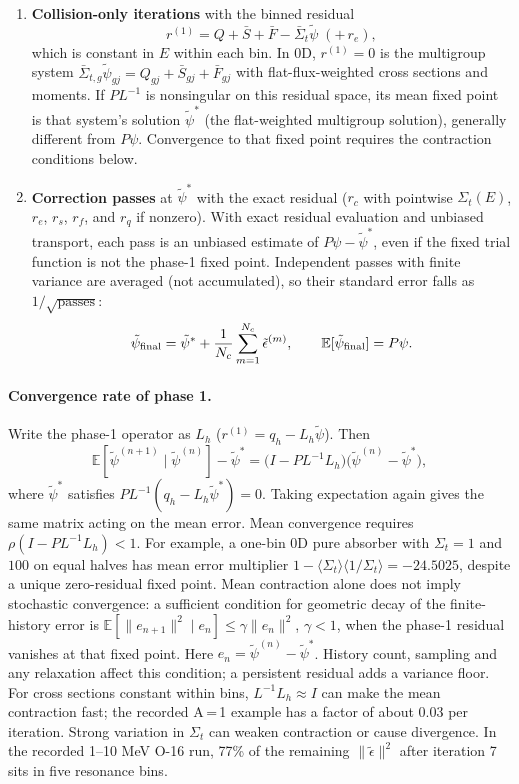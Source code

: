 \documentclass[11pt]{article}
\newcommand{\E}{\mathbb{E}}
\newcommand{\tpsi}{\tilde\psi}
\newcommand{\teps}{\tilde\epsilon}
\newcommand{\Sbar}{\bar S}
\newcommand{\Sigt}{\Sigma_t}
\begin{document}
\begin{enumerate}
\item \textbf{Collision-only iterations} with the binned residual
  \begin{equation}
    r^{(1)}=Q+\Sbar+\bar F-\bar\Sigma_t\tpsi \;(+\,r_e),
  \end{equation}
  which is constant in $E$ within each bin. In 0D, $r^{(1)}=0$ is the multigroup system
  $\bar\Sigma_{t,g}\tpsi_{gj}=Q_{gj}+\Sbar_{gj}+\bar F_{gj}$ with flat-flux-weighted
  cross sections and moments. If $PL^{-1}$ is nonsingular on this residual space,
  its mean fixed point is that system's solution $\tpsi^*$ (the flat-weighted
  multigroup solution), generally different from $P\psi$. Convergence to that
  fixed point requires the contraction conditions below.
\item \textbf{Correction passes} at $\tpsi^*$ with the exact residual
  ($r_c$ with pointwise $\Sigt(E)$, $r_e$, $r_s$, $r_f$, and $r_q$ if nonzero).
  With exact residual evaluation and unbiased transport, each pass is an unbiased
  estimate of $P\psi-\tpsi^*$, even if the fixed trial function is not the phase-1
  fixed point. Independent passes with finite variance are averaged (not accumulated),
  so their standard error falls as $1/\sqrt{\text{passes}}$:
  \begin{equation}
    \tpsi_{\rm final}=\tpsi^*+\frac1{N_c}\sum_{m=1}^{N_c}\teps^{(m)},\qquad
    \E[\tpsi_{\rm final}]=P\psi .
  \end{equation}
\end{enumerate}

\paragraph{Convergence rate of phase 1.} Write the phase-1 operator as $L_h$
($r^{(1)}=q_h-L_h\tpsi$). Then
\begin{equation}
  \E[\tpsi^{(n+1)}\mid\tpsi^{(n)}]-\tpsi^*
  =\big(I-PL^{-1}L_h\big)\big(\tpsi^{(n)}-\tpsi^*\big),
\end{equation}
where $\tpsi^*$ satisfies $PL^{-1}(q_h-L_h\tpsi^*)=0$. Taking expectation
again gives the same matrix acting on the mean error. Mean convergence requires
$\rho(I-PL^{-1}L_h)<1$. For example, a one-bin 0D pure absorber with $\Sigt=1$
and $100$ on equal halves has mean error multiplier
$1-\langle\Sigt\rangle\langle1/\Sigt\rangle=-24.5025$, despite a unique
zero-residual fixed point. Mean contraction alone does not imply stochastic
convergence: a sufficient condition for geometric decay of the finite-history
error is $\E[\|e_{n+1}\|^2\mid e_n]\le\gamma\|e_n\|^2$, $\gamma<1$, when the
phase-1 residual vanishes at that fixed point. Here $e_n=\tpsi^{(n)}-\tpsi^*$.
History count, sampling and any relaxation affect this condition; a persistent
residual adds a variance floor. For cross sections constant within bins,
$L^{-1}L_h\approx I$
can make the mean contraction fast; the recorded A\,=\,1 example has a factor
of about $0.03$ per iteration. Strong variation in $\Sigt$ can weaken contraction
or cause divergence. In the recorded 1--10 MeV O-16 run, 77\% of the
remaining $\|\teps\|^2$ after iteration 7 sits in five resonance bins.
\end{document}
